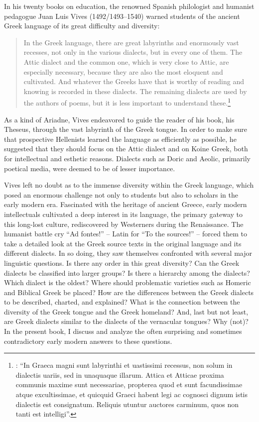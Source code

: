 \addchap{\lsPrefaceTitle} 

In his twenty books on education, the renowned Spanish philologist and humanist pedagogue Juan Luis Vives (1492/1493–1540) warned students of the ancient Greek language of its great difficulty and diversity:

\begin{quote}
In the Greek language, there are great labyrinths and enormously vast recesses, not only in the various dialects, but in every one of them. The Attic dialect and the common one, which is very close to Attic, are especially necessary, because they are also the most eloquent and cultivated. And whatever the Greeks have that is worthy of reading and knowing is recorded in these dialects. The remaining dialects are used by the authors of poems, but it is less important to understand these.\footnote{\citet[e3\textsuperscript{v}]{Vives1531}: “In Graeca magni sunt labyrinthi et uastissimi recessus, non solum in dialectis uariis, sed in unaquaque illarum. Attica et Atticae proxima communis maxime sunt necessariae, propterea quod et sunt facundissimae atque excultissimae, et quicquid Graeci habent legi ac cognosci dignum istis dialectis est consignatum. Reliquis utuntur auctores carminum, quos non tanti est intelligi”.}
\end{quote}

As a kind of Ariadne, Vives endeavored to guide the reader of his book, his Theseus, through the vast labyrinth of the Greek tongue. In order to make sure that prospective Hellenists learned the language as efficiently as possible, he suggested that they should focus on the Attic dialect and on Koine Greek, both for intellectual and esthetic reasons. Dialects such as Doric and Aeolic, primarily poetical media, were deemed to be of lesser importance.

Vives left no doubt as to the immense diversity within the Greek language, which posed an enormous challenge not only to students but also to scholars in the early modern era. Fascinated with the heritage of ancient Greece, early modern intellectuals cultivated a deep interest in its language, the primary gateway to this long-lost culture, rediscovered by Westerners during the Renaissance. The humanist battle cry “Ad fontes!” – Latin for “To the sources!” – forced them to take a detailed look at the Greek source texts in the original language and its different dialects. In so doing, they saw themselves confronted with several major linguistic questions. Is there any order in this great diversity? Can the Greek dialects be classified into larger groups? Is there a hierarchy among the dialects? Which dialect is the oldest? Where should problematic varieties such as Homeric and Biblical Greek be placed? How are the differences between the Greek dialects to be described, charted, and explained? What is the connection between the diversity of the Greek tongue and the Greek homeland? And, last but not least, are Greek dialects similar to the dialects of the vernacular tongues? Why (not)? In the present book, I discuss and analyze the often surprising and sometimes contradictory early modern answers to these questions.
